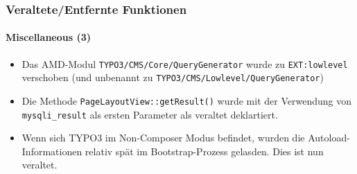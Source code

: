 \begin{frame}[fragile]
	\frametitle{Veraltete/Entfernte Funktionen}
	\framesubtitle{Miscellaneous (3)}

	\begin{itemize}

		\item Das AMD-Modul \texttt{TYPO3/CMS/Core/QueryGenerator} wurde zu \texttt{EXT:lowlevel} verschoben\newline
			\small
				(und unbenannt zu \texttt{TYPO3/CMS/Lowlevel/QueryGenerator})
			\normalsize

		\item Die Methode \texttt{PageLayoutView::getResult()} wurde mit der Verwendung von \texttt{mysqli\_result} als ersten Parameter als veraltet deklartiert.

		\item Wenn sich TYPO3 im Non-Composer Modus befindet, wurden die Autoload-Informationen relativ spät im Bootstrap-Prozess gelasden. Dies ist nun veraltet.
	\end{itemize}

\end{frame}

